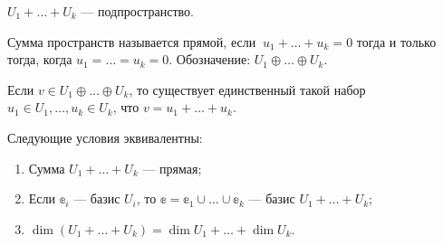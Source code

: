 \begin{Task}
	$U_1+\ldots + U_k$ --- подпространство.
\end{Task}

\begin{Def}
	Сумма пространств называется прямой, если  $\:u_1 + \ldots + u_k = 0$ тогда и только тогда, когда $u_1 = \ldots = u_k = 0$. Обозначение: $U_1 \oplus \ldots \oplus U_k$.
\end{Def}

\begin{Task}
	Если $v \in U_1 \oplus \ldots \oplus U_k$, то существует единственный такой набор \\$u_1 \in U_1, \ldots, u_k \in U_k$, что $v = u_1 + \ldots + u_k$.
\end{Task}

\begin{Theorem}
	Следующие условия эквивалентны:
	\begin{enumerate}
		\item Сумма $U_1 + \ldots + U_k$ --- прямая;
		\item Если $\mathbb{e}_i$ --- базис $U_i$, то $\mathbb{e} = \mathbb{e}_1 \cup \ldots \cup \mathbb{e}_k$ --- базис $U_1 + \ldots + U_k;$
		\item $\dim(U_1 + \ldots + U_k) = \dim{U_1} + \ldots + \dim{U_k}.$
	\end{enumerate}
\end{Theorem}

